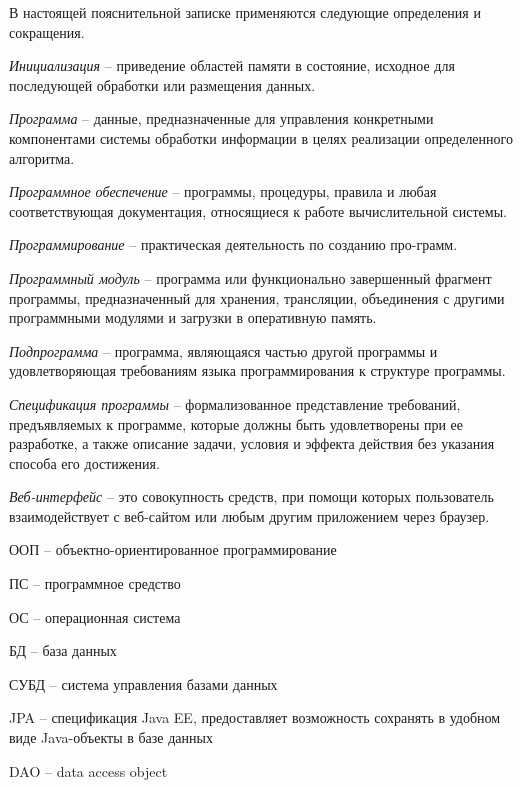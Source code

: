 
В настоящей пояснительной записке применяются следующие определения и сокращения.

\textit{Инициализация} -- приведение областей памяти в состояние, исходное для последующей обработки или размещения данных.

\textit{Программа} -- данные, предназначенные для управления конкретными компонентами системы обработки информации в целях реализации определенного алгоритма.

\textit{Программное обеспечение} -- программы, процедуры, правила и любая соответствующая документация, относящиеся к работе вычислительной системы.

\textit{Программирование} -- практическая деятельность по созданию про-грамм.

\textit{Программный модуль} -- программа или функционально завершенный фрагмент программы, предназначенный для хранения, трансляции, объединения с другими программными модулями и загрузки в оперативную память.

\textit{Подпрограмма} -- программа, являющаяся частью другой программы и удовлетворяющая требованиям языка программирования к структуре программы.

\textit{Спецификация программы} -- формализованное представление требований, предъявляемых к программе, которые должны быть удовлетворены при ее разработке, а также описание задачи, условия и эффекта действия без указания способа его достижения.

\textit{Веб-интерфейс} -- это совокупность средств, при помощи которых пользователь взаимодействует с веб-сайтом или любым другим приложением через браузер.

ООП -- объектно-ориентированное программирование

ПС -- программное средство

ОС -- операционная система

БД -- база данных

СУБД -- система управления базами данных

JPA -- спецификация Java EE, предоставляет возможность сохранять в удобном виде Java-объекты в базе данных

DAO -- data access object
